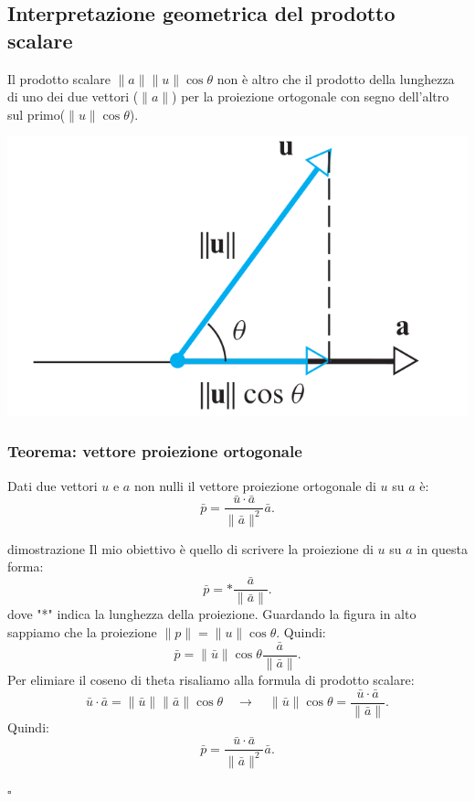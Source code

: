 \documentclass[x11names]{article}
\newcommand*{\QEDB}{\null\nobreak\hfill\ensuremath{\square}}%
\begin{document}
\subsection{Interpretazione geometrica del prodotto scalare}
Il prodotto scalare $\|a\|\|u\|\cos{\theta}$ non è altro che il prodotto della lunghezza di uno dei due vettori ($\|a\|$) per la proiezione ortogonale con segno dell'altro sul primo($\|u\|\cos{\theta}$).

\begin{center}
\includegraphics[scale=0.25]{figures/proj.png}
\end{center}


\begin{center}
	\colorbox{myred}{\begin{minipage}{5.75in}
			\begin{redes}{}
			\subsubsection{Teorema: vettore proiezione ortogonale}
			Dati due vettori $u$ e $a$ non nulli il vettore proiezione ortogonale di $u$ su $a$ è:
			\[
			\bar{p} = \frac{\bar{u}\cdot\bar{ a}}{\|\bar{a}\|^2}\bar{a}
			.\] 	
			\end{redes}
	\end{minipage}}        
\end{center}



\begin{es}{dimostrazione}
Il mio obiettivo è quello di scrivere la proiezione di $u$ su $a$ in questa forma:
\[
\bar{p} = * \frac{\bar{a}}{\|\bar{a}\|}
.\] 
dove "*" indica la lunghezza della proiezione.
Guardando la figura in alto sappiamo che la proiezione $\|p\| = \|u\|\cos{\theta}$. Quindi:
\[
\bar{p} = \|\bar{u}\|\cos{\theta} \frac{\bar{a}}{\|\bar{a}\|} 
.\] 
Per elimiare il coseno di theta risaliamo alla formula di prodotto scalare:
\[
\bar{u} \cdot \bar{a} = \|\bar{u}\|\|\bar{a}\|\cos{\theta} \quad \longrightarrow \quad \|\bar{u}\|\cos{\theta} = \frac{\bar{u}\cdot \bar{a}}{\|\bar{a}\|}
.\] 
Quindi:
\[
\bar{p }= \frac{\bar{u}\cdot \bar{a}}{\|\bar{a}\|^2}\bar{a}
.\] 

\QEDB
\end{es}
\end{document}
